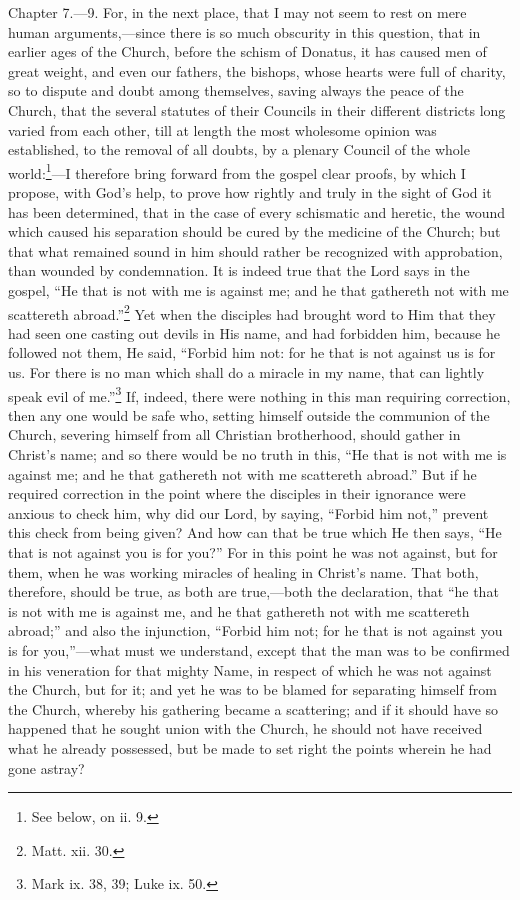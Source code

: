 Chapter 7.—9. For, in the next place, that I may not seem to rest on mere human arguments,—since there is so much obscurity in this question, that in earlier ages of the Church, before the schism of Donatus, it has caused men of great weight, and even our fathers, the bishops, whose hearts were full of charity, so to dispute and doubt among themselves, saving always the peace of the Church, that the several statutes of their Councils in their different districts long varied from each other, till at length the most wholesome opinion was established, to the removal of all doubts, by a plenary Council of the whole world:\footnote{\par  See below, on ii. 9.}—I therefore bring forward from the gospel clear proofs, by which I propose, with God’s help, to prove how rightly and truly in the sight of God it has been determined, that in the case of every schismatic and heretic, the wound which caused his separation should be cured by the medicine of the Church; but that what remained sound in him should rather be recognized with approbation, than wounded by condemnation. It is indeed true that the Lord says in the gospel, ``He that is not with me is against me; and he that gathereth not with me scattereth abroad.''\footnote{\par  Matt. xii. 30.} Yet when the disciples had brought word to Him that they had seen one casting out devils in His name, and had forbidden him, because he followed not them, He said, ``Forbid him not: for he that is not against us is for us. For there is no man which shall do a miracle in my name, that can lightly speak evil of me.''\footnote{\par  Mark ix. 38, 39; Luke ix. 50.} If, indeed, there were nothing in this man requiring correction, then any one would be safe who, setting himself outside the communion of the Church, severing himself from all Christian brotherhood, should gather in Christ’s name; and so there would be no truth in this, ``He that is not with me is against me; and he that gathereth not with me scattereth abroad.'' But if he required correction in the point where the disciples in their ignorance were anxious to check him, why did our Lord, by saying, ``Forbid him not,'' prevent this check from being given? And how can that be true which He then says, ``He that is not against you is for you?'' For in this point he was not against, but for them, when he was working miracles of healing in Christ’s name. That both, therefore, should be true, as both are true,—both the declaration, that ``he that is not with me is against me, and he that gathereth not with me scattereth abroad;'' and also the injunction, ``Forbid him not; for he that is not against you is for you,''—what must we understand, except that the man was to be confirmed in his veneration for that mighty Name, in respect of which he was not against the Church, but for it; and yet he was to be blamed for separating himself from the Church, whereby his gathering became a scattering; and if it should have so happened that he sought union with the Church, he should not have received what he already possessed, but be made to set right the points wherein he had gone astray?

